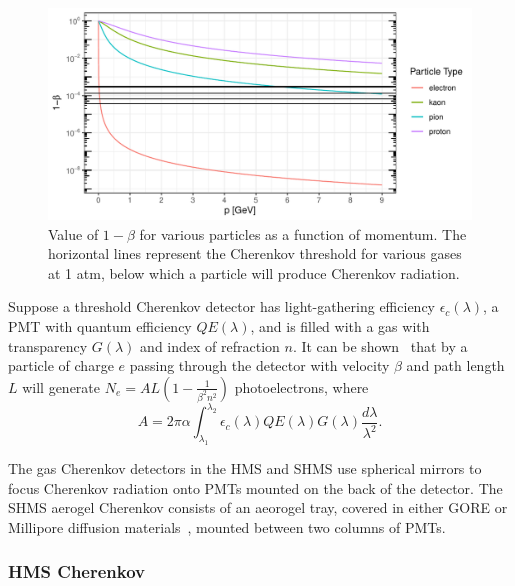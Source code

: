 \begin{figure}[!h]
    \centering
    \includegraphics[width=1.0\textwidth]{chap3/cer_gas_thresholds.pdf}
    \caption{Value of $1-\beta$ for various particles as a function of
            momentum. The horizontal lines represent the Cherenkov threshold
            for various gases at 1 atm, below which a particle
            will produce Cherenkov radiation.
            }
    \label{fig:cer_gas_threshold}
\end{figure}

Suppose a threshold Cherenkov detector has
light-gathering efficiency $\epsilon_c(\lambda)$,
a PMT with quantum efficiency $QE(\lambda)$,
and is filled with a gas with transparency $G(\lambda)$
and index of refraction $n$.
It can be shown~\cite{NGC_Design_Report} that by a particle of charge $e$ passing through the detector
with velocity $\beta$ and path length $L$ will generate
$N_e =AL\left(1-\frac{1}{\beta^2n^2}\right)$ photoelectrons, where
\begin{equation}
A = 2 \pi \alpha \int_{\lambda_1}^{\lambda_2} \epsilon_c(\lambda)QE(\lambda)G(\lambda)\frac{d\lambda}{\lambda^2}.
\end{equation}

The gas Cherenkov detectors in the HMS and SHMS use spherical mirrors to focus
Cherenkov radiation onto PMTs mounted on the back of the detector. The SHMS
aerogel Cherenkov consists of an aeorogel tray, covered in either GORE or
Millipore diffusion materials~\cite{Horn_2017}, mounted between two columns
of PMTs.

\subsubsection{HMS Cherenkov}

